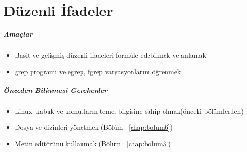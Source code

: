 \chapter{Düzenli İfadeler}
\label{chap:bolum7}
\paragraph{Amaçlar}
\begin{itemize}
 \item Basit ve gelişmiş düzenli ifadeleri formüle edebilmek ve anlamak
 \item grep programı ve egrep, fgrep varyasyonlarını öğrenmek
 \end{itemize}
\paragraph{Önceden Bilinmesi Gerekenler}
\begin{itemize}
 \item Linux, kabuk ve komutların temel bilgisine sahip olmak(önceki bölümlerden)
 \item Dosya ve dizinleri yönetmek (Bölüm ~\ref{chap:bolum6})
 \item Metin editörünü kullanmak (Bölüm ~\ref{chap:bolum3})
\end{itemize}

